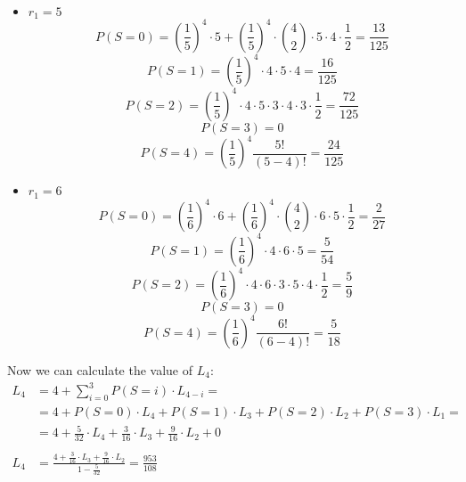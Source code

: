 \begin{itemize}
\item $r_1 = 5$
\begin{equation}
P(S=0) = (\frac{1}{5})^4 \cdot 5 +  (\frac{1}{5})^4 \cdot \binom{4}{2} \cdot 5 \cdot 4 \cdot \frac{1}{2} = \frac{13}{125}
\end{equation}
\begin{equation}
P(S=1) = (\frac{1}{5})^4 \cdot 4 \cdot 5 \cdot 4 = \frac{16}{125}
\end{equation}
\begin{equation}
P(S=2) = (\frac{1}{5})^4 \cdot 4 \cdot 5 \cdot 3 \cdot 4 \cdot 3 \cdot \frac{1}{2} = \frac{72}{125}
\end{equation}
\begin{equation}
P(S=3) = 0
\end{equation}
\begin{equation}
P(S=4) = (\frac{1}{5})^4 \frac{5!}{(5-4)!} = \frac{24}{125}
\end{equation}

\item $r_1 = 6$
\begin{equation}
P(S=0) = (\frac{1}{6})^4 \cdot 6 +  (\frac{1}{6})^4 \cdot \binom{4}{2} \cdot 6 \cdot 5 \cdot \frac{1}{2} = \frac{2}{27}
\end{equation}
\begin{equation}
P(S=1) = (\frac{1}{6})^4 \cdot 4 \cdot 6 \cdot 5 = \frac{5}{54}
\end{equation}
\begin{equation}
P(S=2) = (\frac{1}{6})^4 \cdot 4 \cdot 6 \cdot 3 \cdot 5 \cdot 4 \cdot \frac{1}{2} = \frac{5}{9}
\end{equation}
\begin{equation}
P(S=3) = 0
\end{equation}
\begin{equation}
P(S=4) = (\frac{1}{6})^4 \frac{6!}{(6-4)!} = \frac{5}{18}
\end{equation}
\end{itemize}

Now we can calculate the value of $L_4$:
\begin{equation}
\begin{split}
L_4 & = 4 + \sum_{i=0}^{3} P(S=i) \cdot L_{4-i} = \\
& = 4 + P(S=0) \cdot L_4 + P(S=1) \cdot L_3 +  P(S=2) \cdot L_2 +  P(S=3) \cdot L_1 = \\
& = 4 + \frac{5}{32} \cdot L_4 + \frac{3}{16} \cdot L_3 + \frac{9}{16} \cdot L_2 + 0 \\ \\
L_4 & = \frac{4 + \frac{3}{16} \cdot L_3 + \frac{9}{16} \cdot L_2}{1 - \frac{5}{32}} = \frac{953}{108}
\end{split}
\end{equation}

